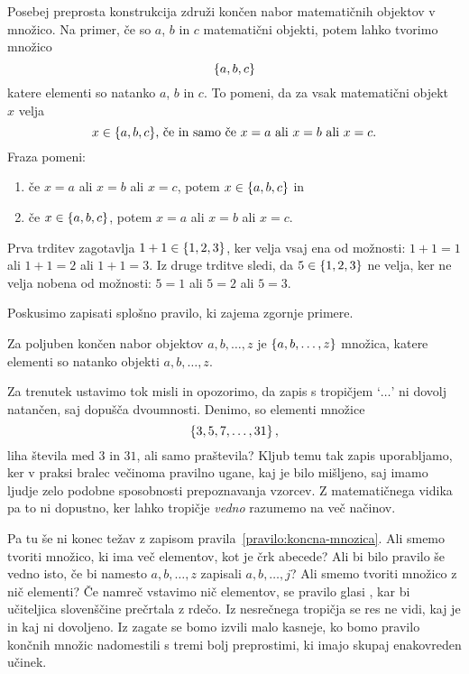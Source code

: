 Posebej preprosta konstrukcija združi končen nabor matematičnih objektov v množico.
Na primer, če so $a$, $b$ in $c$ matematični objekti, potem lahko tvorimo množico
%
\begin{equation*}
  \left\{a, b, c\right\}
\end{equation*}
%
katere elementi so natanko $a$, $b$ in $c$. To pomeni, da za vsak matematični objekt~$x$
velja
%
\begin{equation*}
  \text{$x \in \left\{a, b, c\right\}$, če in samo če $x = a$ ali $x = b$ ali $x = c$.}
\end{equation*}
%
Fraza  pomeni:
%
\begin{enumerate}
\item če $x = a$ ali $x = b$ ali $x = c$, potem $x \in \left\{a, b, c\right\}$ in
\item če $x \in \left\{a, b, c\right\}$, potem $x = a$ ali $x = b$ ali $x = c$.
\end{enumerate}
%
Prva trditev zagotavlja $1+1 \in \left\{1, 2, 3\right\}$, ker velja
vsaj ena od možnosti: $1 + 1 = 1$ ali $1 + 1 = 2$ ali $1 + 1 = 3$. Iz druge trditve sledi, da
$5 \in \left\{1, 2, 3\right\}$ ne velja, ker ne velja nobena od možnosti: $5 = 1$ ali $5 = 2$ ali
$5 = 3$.

Poskusimo zapisati splošno pravilo, ki zajema zgornje primere.

\begin{pravilo}
  \label{pravilo:koncna-mnozica}
  Za poljuben končen nabor objektov $a, b, \ldots, z$ je $\left\{a, b, \ldots, z\right\}$ množica, katere elementi
  so natanko objekti $a, b, \ldots, z$.
\end{pravilo}

Za trenutek ustavimo tok misli in opozorimo, da zapis s tropičjem `$\ldots$' ni dovolj
natančen, saj dopušča dvoumnosti. Denimo, so elementi množice
%
\begin{equation*}
  \left\{3, 5, 7, \ldots, 31\right\},
\end{equation*}
%
liha števila med $3$ in $31$, ali samo praštevila? Kljub
temu tak zapis uporabljamo, ker v praksi bralec večinoma pravilno ugane, kaj je
bilo mišljeno, saj imamo ljudje zelo podobne sposobnosti prepoznavanja vzorcev. Z
matematičnega vidika pa to ni dopustno, ker lahko tropičje \emph{vedno} razumemo na več
načinov.

Pa tu še ni konec težav z zapisom pravila~\ref{pravilo:koncna-mnozica}. Ali smemo
tvoriti množico, ki ima več elementov, kot je črk abecede? Ali bi bilo pravilo še vedno
isto, če bi namesto $a, b, \ldots, z$ zapisali $a, b, \ldots, j$? Ali smemo
tvoriti množico z nič elementi? Če namreč vstavimo nič elementov, se pravilo glasi , kar bi učiteljica
slovenščine prečrtala z rdečo. Iz nesrečnega tropičja se res ne vidi, kaj je in kaj ni dovoljeno. 
%
Iz zagate se bomo izvili malo kasneje, ko bomo pravilo končnih množic nadomestili s tremi
bolj preprostimi, ki imajo skupaj enakovreden učinek.

